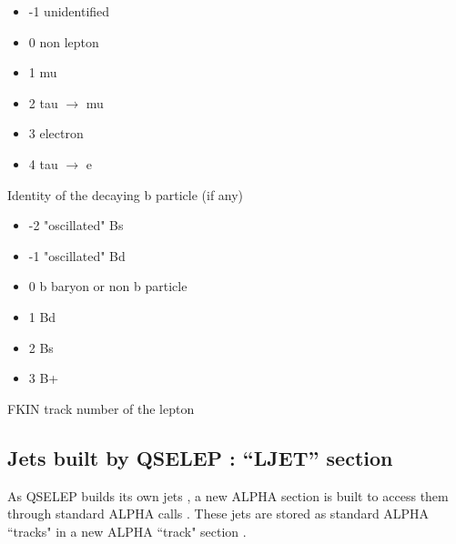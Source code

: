 \begin{indentlist}{ 3.50cm}{ 3.75cm}
\begin{itemize}
\item                         -1   unidentified
\item                          0   non lepton
\item                          1   mu
\item                          2   tau $\rightarrow$ mu
\item                          3   electron
\item                          4   tau $\rightarrow$ e
\end{itemize}
     Identity of the decaying b particle (if any)
 
\begin{itemize}
\item                         -2   "oscillated" Bs
\item                         -1   "oscillated" Bd
\item                          0   b baryon or non b particle
\item                          1   Bd
\item                          2   Bs
\item                          3   B+
\end{itemize}
     FKIN   track number of the lepton
\end{indentlist}
 
\subsection{\label{sec-QSELJT}Jets built by QSELEP : ``LJET'' section}
\par
 
                  As QSELEP builds its own jets , a new ALPHA section is built
         to access them through standard ALPHA calls . These jets are stored
         as standard ALPHA ``tracks" in a new ALPHA ``track" section .
 
